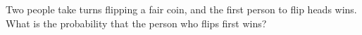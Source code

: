 Two people take turns flipping a fair coin, and the first person to flip heads wins. What is the probability that the person who flips first wins?

